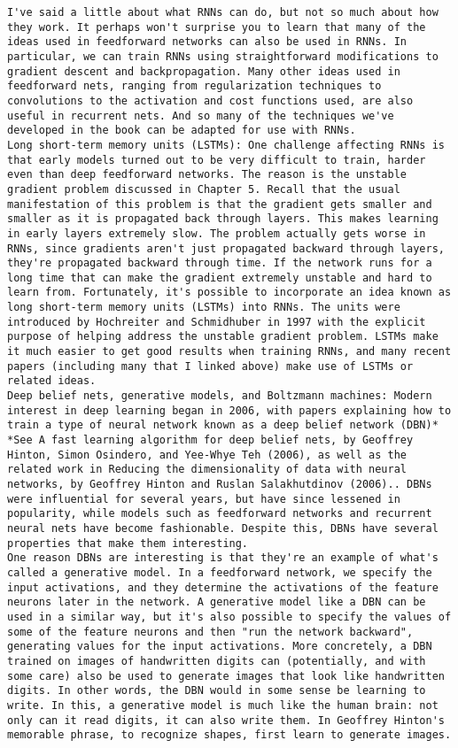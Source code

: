 \begin{lstlisting}
I've said a little about what RNNs can do, but not so much about how they work. It perhaps won't surprise you to learn that many of the ideas used in feedforward networks can also be used in RNNs. In particular, we can train RNNs using straightforward modifications to gradient descent and backpropagation. Many other ideas used in feedforward nets, ranging from regularization techniques to convolutions to the activation and cost functions used, are also useful in recurrent nets. And so many of the techniques we've developed in the book can be adapted for use with RNNs.
Long short-term memory units (LSTMs): One challenge affecting RNNs is that early models turned out to be very difficult to train, harder even than deep feedforward networks. The reason is the unstable gradient problem discussed in Chapter 5. Recall that the usual manifestation of this problem is that the gradient gets smaller and smaller as it is propagated back through layers. This makes learning in early layers extremely slow. The problem actually gets worse in RNNs, since gradients aren't just propagated backward through layers, they're propagated backward through time. If the network runs for a long time that can make the gradient extremely unstable and hard to learn from. Fortunately, it's possible to incorporate an idea known as long short-term memory units (LSTMs) into RNNs. The units were introduced by Hochreiter and Schmidhuber in 1997 with the explicit purpose of helping address the unstable gradient problem. LSTMs make it much easier to get good results when training RNNs, and many recent papers (including many that I linked above) make use of LSTMs or related ideas.
Deep belief nets, generative models, and Boltzmann machines: Modern interest in deep learning began in 2006, with papers explaining how to train a type of neural network known as a deep belief network (DBN)* *See A fast learning algorithm for deep belief nets, by Geoffrey Hinton, Simon Osindero, and Yee-Whye Teh (2006), as well as the related work in Reducing the dimensionality of data with neural networks, by Geoffrey Hinton and Ruslan Salakhutdinov (2006).. DBNs were influential for several years, but have since lessened in popularity, while models such as feedforward networks and recurrent neural nets have become fashionable. Despite this, DBNs have several properties that make them interesting.
One reason DBNs are interesting is that they're an example of what's called a generative model. In a feedforward network, we specify the input activations, and they determine the activations of the feature neurons later in the network. A generative model like a DBN can be used in a similar way, but it's also possible to specify the values of some of the feature neurons and then "run the network backward", generating values for the input activations. More concretely, a DBN trained on images of handwritten digits can (potentially, and with some care) also be used to generate images that look like handwritten digits. In other words, the DBN would in some sense be learning to write. In this, a generative model is much like the human brain: not only can it read digits, it can also write them. In Geoffrey Hinton's memorable phrase, to recognize shapes, first learn to generate images.

\end{lstlisting}
